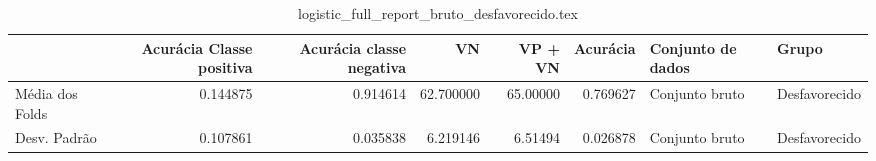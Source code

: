\begin{table}
\centering
\caption{logistic_full_report_bruto_desfavorecido.tex}
\label{logistic_full_report_bruto_desfavorecido.tex}
\begin{tabular}{lrrrrrll}
\toprule
{}              &  Acurácia Classe positiva &  Acurácia classe negativa &        VN  &  VP + VN  &  Acurácia & Conjunto de dados &          Grupo \\
\midrule
Média dos Folds &                  0.144875 &                  0.914614 &  62.700000 &  65.00000 &  0.769627 &    Conjunto bruto &  Desfavorecido \\
Desv. Padrão    &                  0.107861 &                  0.035838 &   6.219146 &   6.51494 &  0.026878 &    Conjunto bruto &  Desfavorecido \\
\bottomrule
\end{tabular}
\end{table}
